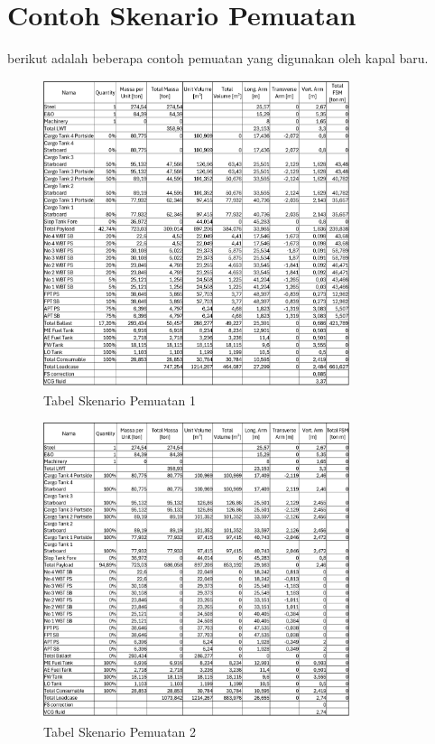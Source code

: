 \newpage


\section*{Contoh Skenario Pemuatan}
\label{sec:contoh-skenario-pemuatan}

berikut adalah beberapa contoh pemuatan yang digunakan oleh kapal baru.

\begin{figure}
    \centering
    \includegraphics[width=0.8\textwidth]{grafik/tabel-pemuatan-1.jpg}
    \caption*{Tabel Skenario Pemuatan 1}
    \label{fig:contoh-skenario-pemuatan-1}
\end{figure}

\begin{figure}
    \centering
    \includegraphics[width=0.8\textwidth]{grafik/tabel-pemuatan-2.jpg}
    \caption*{Tabel Skenario Pemuatan 2}
    \label{fig:contoh-skenario-pemuatan-2}
\end{figure}

